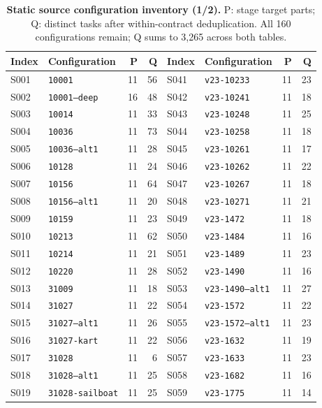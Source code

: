 \begin{table}[p]
\centering\footnotesize
\caption{\textbf{Static source configuration inventory (1/2).} P: stage target parts; Q: distinct tasks after within-contract deduplication. All 160 configurations remain; Q sums to 3,265 across both tables.}
\begin{tabular}{@{}llrr@{\qquad}llrr@{}}
\toprule
Index & Configuration & P & Q & Index & Configuration & P & Q\\
\midrule
S001 & \texttt{10001} & 11 & 56 & S041 & \texttt{v23-10233} & 11 & 23\\
S002 & \texttt{10001--deep} & 16 & 48 & S042 & \texttt{v23-10241} & 11 & 18\\
S003 & \texttt{10014} & 11 & 33 & S043 & \texttt{v23-10248} & 11 & 25\\
S004 & \texttt{10036} & 11 & 73 & S044 & \texttt{v23-10258} & 11 & 18\\
S005 & \texttt{10036--alt1} & 11 & 28 & S045 & \texttt{v23-10261} & 11 & 17\\
S006 & \texttt{10128} & 11 & 24 & S046 & \texttt{v23-10262} & 11 & 22\\
S007 & \texttt{10156} & 11 & 64 & S047 & \texttt{v23-10267} & 11 & 18\\
S008 & \texttt{10156--alt1} & 11 & 20 & S048 & \texttt{v23-10271} & 11 & 21\\
S009 & \texttt{10159} & 11 & 23 & S049 & \texttt{v23-1472} & 11 & 18\\
S010 & \texttt{10213} & 11 & 62 & S050 & \texttt{v23-1484} & 11 & 16\\
S011 & \texttt{10214} & 11 & 21 & S051 & \texttt{v23-1489} & 11 & 23\\
S012 & \texttt{10220} & 11 & 28 & S052 & \texttt{v23-1490} & 11 & 16\\
S013 & \texttt{31009} & 11 & 18 & S053 & \texttt{v23-1490--alt1} & 11 & 27\\
S014 & \texttt{31027} & 11 & 22 & S054 & \texttt{v23-1572} & 11 & 22\\
S015 & \texttt{31027--alt1} & 11 & 26 & S055 & \texttt{v23-1572--alt1} & 11 & 23\\
S016 & \texttt{31027-kart} & 11 & 22 & S056 & \texttt{v23-1632} & 11 & 19\\
S017 & \texttt{31028} & 11 & 6 & S057 & \texttt{v23-1633} & 11 & 23\\
S018 & \texttt{31028--alt1} & 11 & 25 & S058 & \texttt{v23-1682} & 11 & 16\\
S019 & \texttt{31028-sailboat} & 11 & 25 & S059 & \texttt{v23-1775} & 11 & 14\\

\end{tabular}
\end{table}
